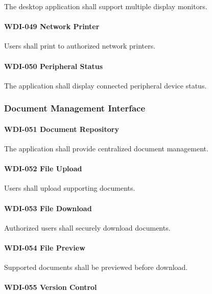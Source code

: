 The desktop application shall support multiple display monitors.

\paragraph{WDI-049 Network Printer}

Users shall print to authorized network printers.

\paragraph{WDI-050 Peripheral Status}

The application shall display connected peripheral device status.


\subsubsection*{Document Management Interface}

\paragraph{WDI-051 Document Repository}

The application shall provide centralized document management.

\paragraph{WDI-052 File Upload}

Users shall upload supporting documents.

\paragraph{WDI-053 File Download}

Authorized users shall securely download documents.

\paragraph{WDI-054 File Preview}

Supported documents shall be previewed before download.

\paragraph{WDI-055 Version Control}

